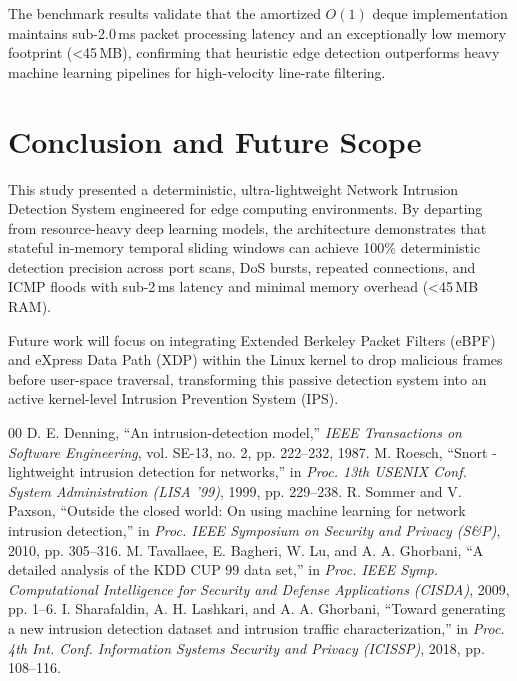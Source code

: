 \documentclass[conference]{IEEEtran}
\begin{document}
The benchmark results validate that the amortized $O(1)$ deque implementation maintains sub-2.0\,ms packet processing latency and an exceptionally low memory footprint (<45\,MB), confirming that heuristic edge detection outperforms heavy machine learning pipelines for high-velocity line-rate filtering.

\section{Conclusion and Future Scope}
This study presented a deterministic, ultra-lightweight Network Intrusion Detection System engineered for edge computing environments. By departing from resource-heavy deep learning models, the architecture demonstrates that stateful in-memory temporal sliding windows can achieve 100\% deterministic detection precision across port scans, DoS bursts, repeated connections, and ICMP floods with sub-2\,ms latency and minimal memory overhead (<45\,MB RAM).

Future work will focus on integrating Extended Berkeley Packet Filters (eBPF) and eXpress Data Path (XDP) within the Linux kernel to drop malicious frames before user-space traversal, transforming this passive detection system into an active kernel-level Intrusion Prevention System (IPS).

\begin{thebibliography}{00}
 D. E. Denning, ``An intrusion-detection model,'' \textit{IEEE Transactions on Software Engineering}, vol. SE-13, no. 2, pp. 222--232, 1987.
 M. Roesch, ``Snort - lightweight intrusion detection for networks,'' in \textit{Proc. 13th USENIX Conf. System Administration (LISA '99)}, 1999, pp. 229--238.
 R. Sommer and V. Paxson, ``Outside the closed world: On using machine learning for network intrusion detection,'' in \textit{Proc. IEEE Symposium on Security and Privacy (S\&P)}, 2010, pp. 305--316.
 M. Tavallaee, E. Bagheri, W. Lu, and A. A. Ghorbani, ``A detailed analysis of the KDD CUP 99 data set,'' in \textit{Proc. IEEE Symp. Computational Intelligence for Security and Defense Applications (CISDA)}, 2009, pp. 1--6.
 I. Sharafaldin, A. H. Lashkari, and A. A. Ghorbani, ``Toward generating a new intrusion detection dataset and intrusion traffic characterization,'' in \textit{Proc. 4th Int. Conf. Information Systems Security and Privacy (ICISSP)}, 2018, pp. 108--116.
\end{thebibliography}
\end{document}
